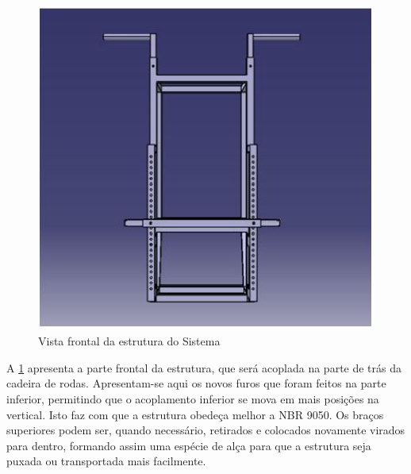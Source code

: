 \begin{figure}[!htb]
\centering
\includegraphics[keepaspectratio=true,scale=0.7]{figuras/resultados/vista_frontal_estrutura}
\caption{Vista frontal da estrutura do Sistema}
\label{fig:vista_frontal_estrutura}
\end{figure}


A \ref{fig:vista_frontal_estrutura} apresenta a parte frontal da estrutura, que será acoplada na parte de trás da cadeira de rodas. Apresentam-se aqui os novos furos que foram feitos na parte inferior, permitindo que o acoplamento inferior se mova em mais posições na vertical. Isto faz com que a estrutura obedeça melhor a NBR 9050. Os braços superiores podem ser, quando necessário, retirados e colocados novamente virados para dentro, formando assim uma espécie de alça para que a estrutura seja puxada ou transportada mais facilmente.


